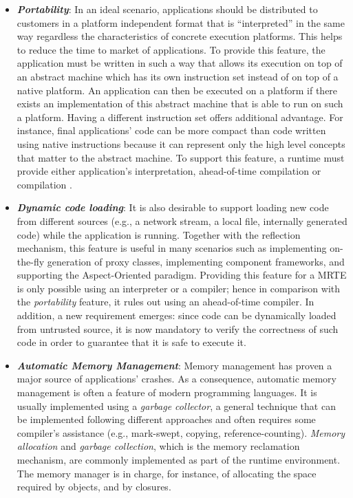 \begin{itemize}
\item \textbf{\textit{Portability}}:
In an ideal scenario, applications should be distributed to customers in a platform independent format that is ``interpreted'' in the same way regardless the characteristics of concrete execution platforms.
This helps to reduce the time to market of applications.
To provide this feature, the application must be written in such a way that allows its execution on top of an abstract machine which has its own instruction set instead of on top of a native platform.
An application can then be executed on a platform if there exists an implementation of this abstract machine that is able to run on such a platform.
Having a different instruction set offers additional advantage.
For instance, final applications' code can be more compact than code written using native instructions because it can represent only the high level concepts that matter to the abstract machine.
To support this feature, a runtime must provide either application's interpretation, ahead-of-time compilation \cite{Muller:1997:HFE:1268028.1268029,Proebsting:1997:TJA:1268028.1268031,Wang:2011:MAC:2038698.2038704,Oh:2015:BAC:2757012.2757057} or  compilation \cite{Inoue:2012:AMC:2398857.2384630,Paleczny:2001:JHT:1267847.1267848,Grcevski:2004:JTJ:1267242.1267254}.

\item \textbf{\textit{Dynamic code loading}}:
It is also desirable to support loading new code from different sources (e.g., a network stream, a local file, internally generated code) while the application is running.
Together with the reflection mechanism, this feature is useful in many scenarios such as implementing on-the-fly generation of proxy classes, implementing component frameworks, and supporting the Aspect-Oriented paradigm.
Providing this feature for a MRTE is only possible using an interpreter or a  compiler; hence in comparison with the \textit{portability} feature, it rules out using an ahead-of-time compiler.
In addition, a new requirement emerges: since code can be dynamically loaded from untrusted source, it is now mandatory to verify the correctness of such code in order to guarantee that it is safe to execute it.  

\item \textbf{\textit{Automatic Memory Management}}: 
Memory management has proven a major source of applications' crashes.
As a consequence, automatic memory management is often a feature of modern programming languages.
It is usually implemented using a \textit{garbage collector}, a general technique that can be implemented following different approaches and often requires some compiler's assistance (e.g., mark-swept, copying, reference-counting).
\textit{Memory allocation} and \textit{garbage collection}, which is the memory reclamation mechanism, are commonly implemented as part of the runtime environment.
The memory manager is in charge, for instance, of allocating the space required by objects, and by closures.


\end{itemize}
